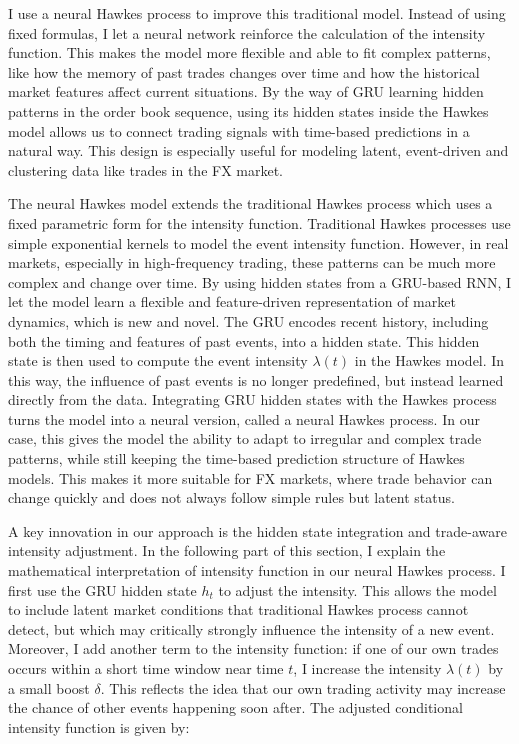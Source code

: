I use a neural Hawkes process to improve this traditional model. Instead of using fixed formulas, I let a neural network reinforce the calculation of the intensity function. This makes the model more flexible and able to fit complex patterns, like how the memory of past trades changes over time and how the historical market features affect current situations. By the way of GRU learning hidden patterns in the order book sequence, using its hidden states inside the Hawkes model allows us to connect trading signals with time-based predictions in a natural way. This design is especially useful for modeling latent, event-driven and clustering data like trades in the FX market.


The neural Hawkes model extends the traditional Hawkes process which uses a fixed parametric form for the intensity function. Traditional Hawkes processes use simple exponential kernels to model the event intensity function. However, in real markets, especially in high-frequency trading, these patterns can be much more complex and change over time. By using hidden states from a GRU-based RNN, I let the model learn a flexible and feature-driven representation of market dynamics, which is new and novel. The GRU encodes recent history, including both the timing and features of past events, into a hidden state. This hidden state is then used to compute the event intensity $\lambda(t)$ in the Hawkes model. In this way, the influence of past events is no longer predefined, but instead learned directly from the data. Integrating GRU hidden states with the Hawkes process turns the model into a neural version, called a neural Hawkes process. In our case, this gives the model the ability to adapt to irregular and complex trade patterns, while still keeping the time-based prediction structure of Hawkes models. This makes it more suitable for FX markets, where trade behavior can change quickly and does not always follow simple rules but latent status.


A key innovation in our approach is the hidden state integration and trade-aware intensity adjustment. In the following part of this section, I explain the mathematical interpretation of intensity function in our neural Hawkes process. I first use the GRU hidden state $h_t$ to adjust the intensity. This allows the model to include latent market conditions that traditional Hawkes process cannot detect, but which may critically strongly influence the intensity of a new event. Moreover, I add another term to the intensity function: if one of our own trades occurs within a short time window near time $t$, I increase the intensity $\lambda(t)$ by a small boost $\delta$. This reflects the idea that our own trading activity may increase the chance of other events happening soon after. The adjusted conditional intensity function is given by:

